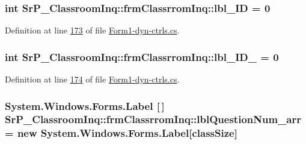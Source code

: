 \hypertarget{class_sr_p___classroom_inq_1_1frm_classrrom_inq_a15d44adc56e5e6523bfadd27d9966935}{
\subsubsection[{lbl\-\_\-\-I\-D}]{\setlength{\rightskip}{0pt plus 5cm}int {\bf \-Sr\-P\-\_\-\-Classroom\-Inq\-::frm\-Classrrom\-Inq\-::lbl\-\_\-\-I\-D} = 0}}
\label{class_sr_p___classroom_inq_1_1frm_classrrom_inq_a15d44adc56e5e6523bfadd27d9966935}


\-Definition at line \hyperlink{_form1-dyn-ctrls_8cs_source_l00173}{173} of file \hyperlink{_form1-dyn-ctrls_8cs_source}{\-Form1-\/dyn-\/ctrls.\-cs}.

\hypertarget{class_sr_p___classroom_inq_1_1frm_classrrom_inq_a5d14fbec9e02ebe6942d26ae8ed53d3b}{
\subsubsection[{lbl\-\_\-\-I\-D\-\_\-2}]{\setlength{\rightskip}{0pt plus 5cm}int {\bf \-Sr\-P\-\_\-\-Classroom\-Inq\-::frm\-Classrrom\-Inq\-::lbl\-\_\-\-I\-D\-\_} = 0}}
\label{class_sr_p___classroom_inq_1_1frm_classrrom_inq_a5d14fbec9e02ebe6942d26ae8ed53d3b}


\-Definition at line \hyperlink{_form1-dyn-ctrls_8cs_source_l00174}{174} of file \hyperlink{_form1-dyn-ctrls_8cs_source}{\-Form1-\/dyn-\/ctrls.\-cs}.

\hypertarget{class_sr_p___classroom_inq_1_1frm_classrrom_inq_ae46e928c386c686caa96bfe4f302c2f1}{
\subsubsection[{lbl\-Question\-Num\-\_\-arr}]{\setlength{\rightskip}{0pt plus 5cm}\-System.\-Windows.\-Forms.\-Label \mbox{[}$\,$\mbox{]} {\bf \-Sr\-P\-\_\-\-Classroom\-Inq\-::frm\-Classrrom\-Inq\-::lbl\-Question\-Num\-\_\-arr} = new \-System.\-Windows.\-Forms.\-Label\mbox{[}{\bf class\-Size}\mbox{]}}}
\label{class_sr_p___classroom_inq_1_1frm_classrrom_inq_ae46e928c386c686caa96bfe4f302c2f1}


